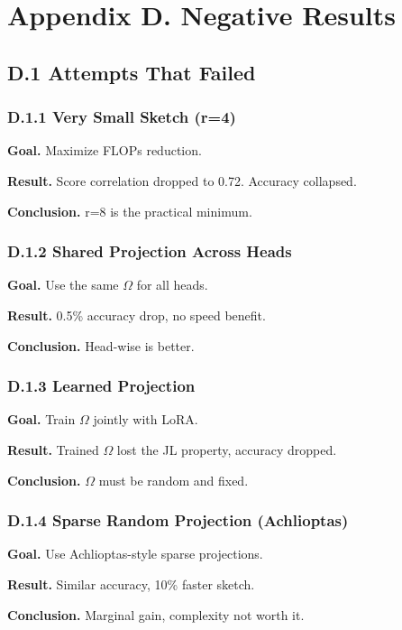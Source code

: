 
\section{Appendix D. Negative Results}

\subsection{D.1 Attempts That Failed}

\subsubsection{D.1.1 Very Small Sketch (r=4)}

\textbf{Goal.} Maximize FLOPs reduction.

\textbf{Result.} Score correlation dropped to 0.72. Accuracy collapsed.

\textbf{Conclusion.} r=8 is the practical minimum.

\subsubsection{D.1.2 Shared Projection Across Heads}

\textbf{Goal.} Use the same $\Omega$ for all heads.

\textbf{Result.} 0.5\% accuracy drop, no speed benefit.

\textbf{Conclusion.} Head-wise is better.

\subsubsection{D.1.3 Learned Projection}

\textbf{Goal.} Train $\Omega$ jointly with LoRA.

\textbf{Result.} Trained $\Omega$ lost the JL property, accuracy dropped.

\textbf{Conclusion.} $\Omega$ must be random and fixed.

\subsubsection{D.1.4 Sparse Random Projection (Achlioptas)}

\textbf{Goal.} Use Achlioptas-style sparse projections.

\textbf{Result.} Similar accuracy, 10\% faster sketch.

\textbf{Conclusion.} Marginal gain, complexity not worth it.

